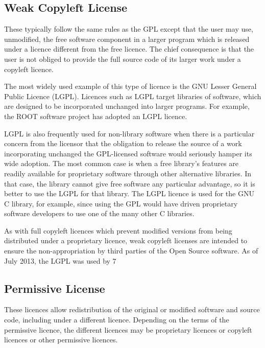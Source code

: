 \documentclass[12pt,a4paper]{article}
\begin{document}
\subsection{Weak Copyleft License}
\label{sec:WeakCopyleft}

These typically follow the same rules as the GPL except that the user may use, unmodified, the free software component in a larger program which is released under a licence different from the free licence. The chief consequence is that the user is not obliged to provide the full source code of its larger work under a copyleft licence.

The most widely used example of this type of licence is the GNU Lesser General Public Licence (LGPL). Licences such as LGPL target libraries of software, which are designed to be incorporated unchanged into larger programs. For example, the ROOT software project \cite{[5]} has adopted an LGPL licence. 

LGPL is also frequently used for non-library software when there is a particular concern from the licensor that the obligation to release the source of a work incorporating unchanged the GPL-licensed software would seriously hamper its wide adoption. The most common case is when a free library's features are readily available for proprietary software through other alternative libraries. In that case, the library cannot give free software any particular advantage, so it is better to use the LGPL for that library. The LGPL licence is used for the GNU C library, for example, since using the GPL would have driven proprietary software developers to use one of the many other C libraries.

As with full copyleft licences which prevent modified versions from being distributed under a proprietary licence, weak copyleft licenses are intended to ensure the non-appropriation by third parties of the Open Source software. 
As of July 2013, the LGPL was used by 7%

\subsection{Permissive License}
\label{sec:PermissiveLicense}

These licences allow redistribution of the original or modified software and source code, including under a different licence.  Depending on the terms of the permissive licence,  the different licences may be proprietary licences or copyleft licences or other permissive licences. 
\end{document}
